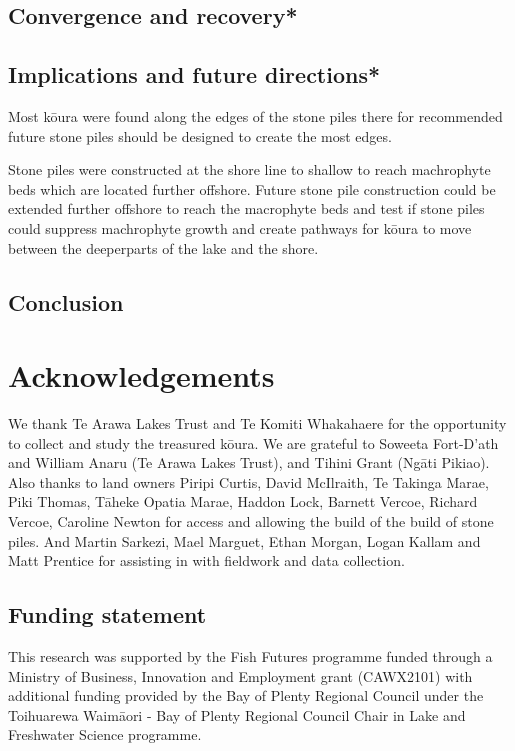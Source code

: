 \documentclass[
  12pt,
  a4paper,
  oneside]{scrbook}
\begin{document}
\subsection{Convergence and recovery*}\label{convergence-and-recovery}

\subsection{Implications and future
directions*}\label{implications-and-future-directions}

Most kōura were found along the edges of the stone piles there for
recommended future stone piles should be designed to create the most
edges.

Stone piles were constructed at the shore line to shallow to reach
machrophyte beds which are located further offshore. Future stone pile
construction could be extended further offshore to reach the macrophyte
beds and test if stone piles could suppress machrophyte growth and
create pathways for kōura to move between the deeperparts of the lake
and the shore.

\subsection{Conclusion}\label{conclusion-1}

\section{Acknowledgements}\label{acknowledgements-4}

We thank Te Arawa Lakes Trust and Te Komiti Whakahaere for the
opportunity to collect and study the treasured kōura. We are grateful to
Soweeta Fort-D'ath and William Anaru (Te Arawa Lakes Trust), and Tihini
Grant (Ngāti Pikiao). Also thanks to land owners Piripi Curtis, David
McIlraith, Te Takinga Marae, Piki Thomas, Tāheke Opatia Marae, Haddon
Lock, Barnett Vercoe, Richard Vercoe, Caroline Newton for access and
allowing the build of the build of stone piles. And Martin Sarkezi, Mael
Marguet, Ethan Morgan, Logan Kallam and Matt Prentice for assisting in
with fieldwork and data collection.

\subsection{Funding statement}\label{funding-statement-3}

This research was supported by the Fish Futures programme funded through
a Ministry of Business, Innovation and Employment grant (CAWX2101) with
additional funding provided by the Bay of Plenty Regional Council under
the Toihuarewa Waimāori - Bay of Plenty Regional Council Chair in Lake
and Freshwater Science programme.
\end{document}
